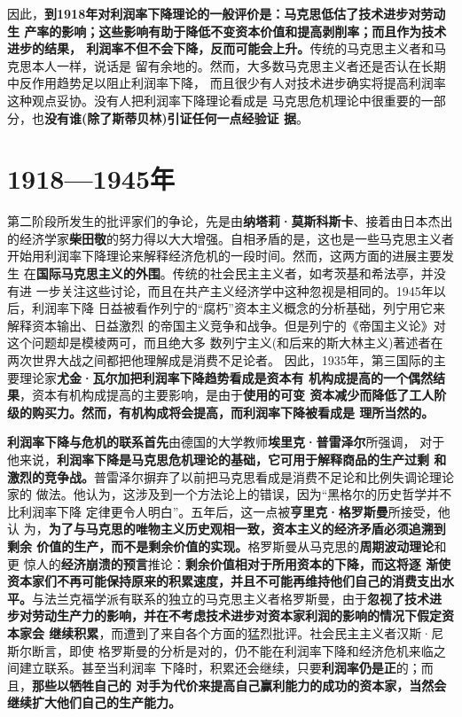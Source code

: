 因此，\textbf{到1918年对利润率下降理论的一般评价是：马克思低估了技术进步对劳动生
  产率的影响；这些影响有助于降低不变资本价值和提高剥削率；而且作为技术进步的结果，
  利润率不但不会下降，反而可能会上升。}传统的马克思主义者和马克思本人一样，说话是
留有余地的。然而，大多数马克思主义者还是否认在长期中反作用趋势足以阻止利润率下降，
而且很少有人对技术进步确实将提高利润率这种观点妥协。没有人把利润率下降理论看成是
马克思危机理论中很重要的一部分，也\textbf{没有谁(除了斯蒂贝林)引证任何一点经验证
  据}。

\section{1918—1945年}
第二阶段所发生的批评家们的争论，先是由\textbf{纳塔莉·莫斯科斯卡}、接着由日本杰出
的经济学家\textbf{柴田敬}的努力得以大大增强。自相矛盾的是，这也是一些马克思主义者
开始用利润率下降理论来解释经济危机的一段时间。然而，这两方面的进展主要发生
在\textbf{国际马克思主义的外围}。传统的社会民主主义者，如考茨基和希法亭，并没有进
一步关注这些讨论，而且在共产主义经济学中这种忽视是相同的。1945年以后，利润率下降
日益被看作列宁的“腐朽”资本主义概念的分析基础，列宁用它来解释资本输出、日益激烈
的帝国主义竞争和战争。但是列宁的《帝国主义论》对这个问题却是模棱两可，而且绝大多
数列宁主义(和后来的斯大林主义)著述者在两次世界大战之间都把他理解成是消费不足论者。
因此，1935年，第三国际的主要理论家\textbf{尤金·瓦尔加把利润率下降趋势看成是资本有
  机构成提高的一个偶然结果}，资本有机构成提高的主要影响，是由于\textbf{使用的可变
  资本减少而降低了工人阶级的购买力。然而，有机构成将会提高，而利润率下降被看成是
  理所当然的。}

\textbf{利润率下降与危机的联系首先}由德国的大学教师\textbf{埃里克·普雷泽尔}所强调，
对于他来说，\textbf{利润率下降是马克思危机理论的基础，它可用于解释商品的生产过剩
  和激烈的竞争战。}普雷泽尔摒弃了以前把马克思看成是消费不足论和比例失调论理论家的
做法。他认为，这涉及到一个方法论上的错误，因为“黑格尔的历史哲学并不比利润率下降
定律更令人明白”。五年后，这一点被\textbf{亨里克·格罗斯曼}所接受，他认
为，\textbf{为了与马克思的唯物主义历史观相一致，资本主义的经济矛盾必须追溯到剩余
  价值的生产，而不是剩余价值的实现。}格罗斯曼从马克思的\textbf{周期波动理论}和更
惊人的\textbf{经济崩溃的预言}推论：\textbf{剩余价值相对于所用资本的下降，而这将逐
  渐使资本家们不再可能保持原来的积累速度，并且不可能再维持他们自己的消费支出水
  平。}与法兰克福学派有联系的独立的马克思主义者格罗斯曼，由于\textbf{忽视了技术进
  步对劳动生产力的影响，并在不考虑技术进步对资本家利润的影响的情况下假定资本家会
  继续积累}，而遭到了来自各个方面的猛烈批评。社会民主主义者汉斯·尼斯尔断言，即使
格罗斯曼的分析是对的，仍不能在利润率下降和经济危机来临之间建立联系。甚至当利润率
下降时，积累还会继续，只要\textbf{利润率仍是正}的；而且，\textbf{那些以牺牲自己的
  对手为代价来提高自己赢利能力的成功的资本家，当然会继续扩大他们自己的生产能力。}

